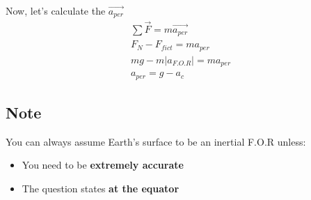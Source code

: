 Now, let's calculate the $\vec{a_{per}}$
\begin{gather}
    \sum \vec{F} = m\vec{a_{per}}\\
    F_N - F_{fict} = ma_{per}\\
    mg - m\left|a_{F.O.R}\right| = ma_{per}\\
    a_{per} = g - a_c
\end{gather}

\subsection*{Note}
    You can always assume Earth's surface to be an inertial F.O.R unless:
    \begin{itemize}
        \item You need to be \textbf{extremely accurate}
        \item The question states \textbf{at the equator}
    \end{itemize}
